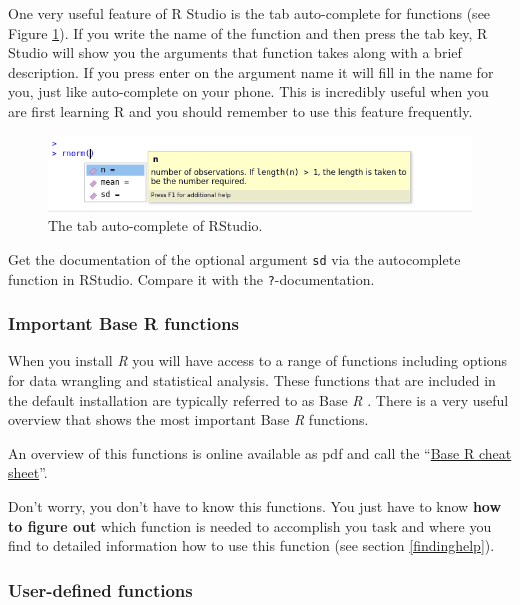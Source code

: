 \documentclass[
]{scrartcl}
\makeatletter
\newenvironment{kframe}{%
\medskip{}
\setlength{\fboxsep}{.8em}
 \def\at@end@of@kframe{}%
 \ifinner\ifhmode%
  \def\at@end@of@kframe{\end{minipage}}%
  \begin{minipage}{\columnwidth}%
 \fi\fi%
 \def\FrameCommand##1{\hskip\@totalleftmargin \hskip-\fboxsep
 \colorbox{shadecolor}{##1}\hskip-\fboxsep
     \hskip-\linewidth \hskip-\@totalleftmargin \hskip\columnwidth}%
 \MakeFramed {\advance\hsize-\width
   \@totalleftmargin\z@ \linewidth\hsize
   \@setminipage}}%
 {\par\unskip\endMakeFramed%
 \at@end@of@kframe}
\newenvironment{rmdblock}[1]
  {
  \begin{itemize}
  \renewcommand{\labelitemi}{
    \raisebox{-.7\height}[0pt][0pt]{
      {\setkeys{Gin}{width=3em,keepaspectratio}\texttt{[image: images/\#1]}}
    }
  }
  \setlength{\fboxsep}{1em}
  \begin{kframe}
  \item
  }
  {
  \end{kframe}
  \end{itemize}
  }
\newenvironment{myexercise}
    {\begin{rmdblock}{exercise_green}}
    {\end{rmdblock}}
\makeatother
\begin{document}
One very useful feature of R Studio is the tab auto-complete for functions (see Figure \ref{fig:autocomplete}). If you write the name of the function and then press the tab key, R Studio will show you the arguments that function takes along with a brief description. If you press enter on the argument name it will fill in the name for you, just like auto-complete on your phone. This is incredibly useful when you are first learning R and you should remember to use this feature frequently.

\begin{figure}
\includegraphics[width=450px]{images/autocomplete} \caption{The tab auto-complete of RStudio.}\label{fig:autocomplete}
\end{figure}

\begin{myexercise}
Get the documentation of the optional argument \texttt{sd} via the
autocomplete function in RStudio. Compare it with the
\texttt{?}-documentation.
\end{myexercise}

\hypertarget{important-base-r-functions}{%
\subsubsection{Important Base R functions}\label{important-base-r-functions}}

When you install \emph{R} you will have access to a range of functions including options for data wrangling and statistical analysis. These functions that are included in the default installation are typically referred to as Base \emph{R} . There is a very useful overview that shows the most important Base \emph{R} functions.

An overview of this functions is online available as pdf and call the ``\protect\hyperlink{cheatsheets}{Base R cheat sheet}''.

Don't worry, you don't have to know this functions. You just have to know \textbf{how to figure out} which function is needed to accomplish you task and where you find to detailed information how to use this function (see section \ref{findinghelp}).

\hypertarget{user-defined-functions}{%
\subsubsection{User-defined functions}\label{user-defined-functions}}
\end{document}
